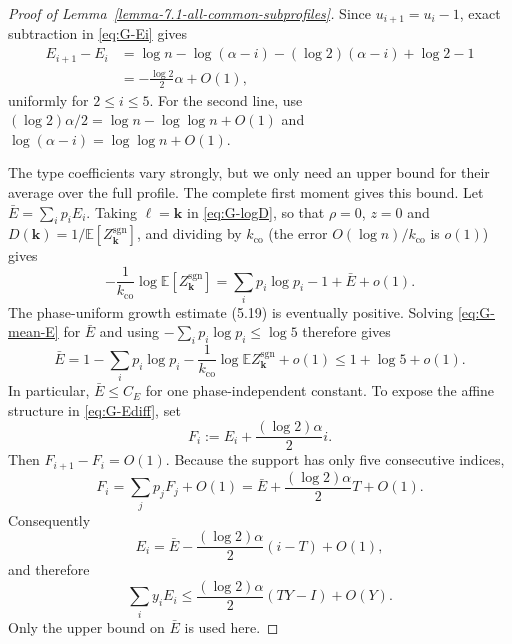 \documentclass[a4paper,10pt,reqno]{amsart}
\numberwithin{equation}{section}
\newcommand{\Exp}[1]{\mathbb{E}\!\left[#1\right]}
\theoremstyle{plain}
\theoremstyle{remark}
\begin{document}
\begin{proof}[Proof of Lemma~\ref{lemma-7.1-all-common-subprofiles}]
Since $u_{i+1}=u_i-1$, exact subtraction in \eqref{eq:G-Ei} gives
\begin{equation}
\begin{aligned}
 E_{i+1}-E_i
 &=\log n-\log(\alpha-i)-(\log 2)(\alpha-i)+\log 2-1\\
 &=-\frac{\log 2}{2}\alpha+O(1),
\end{aligned}
 \label{eq:G-Ediff}
\end{equation}
uniformly for $2\le i\le5$. For the second line, use
$(\log 2)\alpha/2=\log n-\log\log n+O(1)$ and
$\log(\alpha-i)=\log\log n+O(1)$.

The type coefficients vary strongly, but we only need an upper bound for
their average over the full profile. The complete first moment gives this
bound. Let $\bar E=\sum_i p_iE_i$. Taking $\ell=\mathbf k$ in
\eqref{eq:G-logD}, so that $\rho=0$, $z=0$ and
$D(\mathbf k)=1/\Exp{Z_{\mathbf k}^{\mathrm{sgn}}}$, and dividing by
$k_{\mathrm{co}}$ (the error $O(\log n)/k_{\mathrm{co}}$ is $o(1)$) gives
\begin{equation}
 -\frac1{k_{\mathrm{co}}}
   \log \Exp{Z_{\mathbf k}^{\mathrm{sgn}}}
 =\sum_i p_i\log p_i-1+\bar E+o(1).
 \label{eq:G-mean-E}
\end{equation}
The phase-uniform growth estimate (5.19) is eventually positive.  Solving
\eqref{eq:G-mean-E} for $\bar E$ and using
$-\sum_i p_i\log p_i\le\log5$ therefore gives
\[
  \bar E
  =1-\sum_i p_i\log p_i
    -\frac1{k_{\mathrm{co}}}\log\mathbb E Z_{\mathbf k}^{\mathrm{sgn}}
    +o(1)
  \le1+\log5+o(1).
\]
In particular, $\bar E\le C_E$ for one phase-independent constant. To expose
the affine structure in \eqref{eq:G-Ediff}, set
\[
  F_i:=E_i+\frac{(\log 2)\alpha}{2}i.
\]
Then $F_{i+1}-F_i=O(1)$. Because the support has only five consecutive
indices,
\[
  F_i=\sum_jp_jF_j+O(1)
     =\bar E+\frac{(\log 2)\alpha}{2}T+O(1).
\]
Consequently
\[
  E_i=\bar E-\frac{(\log 2)\alpha}{2}(i-T)+O(1),
\]
and therefore
\begin{equation}
 \sum_i y_iE_i
 \le\frac{(\log 2)\alpha}{2}(TY-I)+O(Y).
 \label{eq:G-sumyE}
\end{equation}
Only the upper bound on $\bar E$ is used here.


\end{proof}
\end{document}
